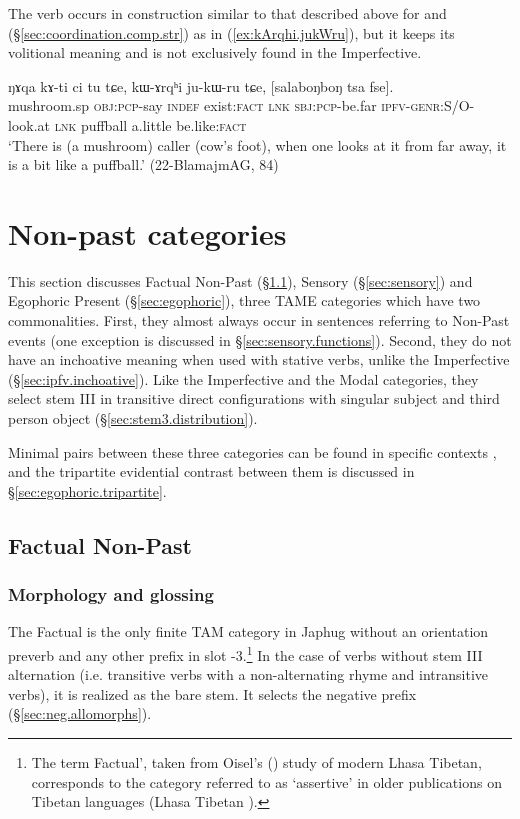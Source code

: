 The verb  occurs in construction similar to that described above for  and  (§\ref{sec:coordination.comp.str}) as in (\ref{ex:kArqhi.jukWru}), but it keeps its volitional meaning and is not exclusively found in the Imperfective.

\begin{exe}
\ex \label{ex:kArqhi.jukWru}
\gll ŋɤqa kɤ-ti ci tu tɕe, kɯ-ɤrqʰi ju-kɯ-ru tɕe, [salaboŋboŋ tsa fse].  \\
mushroom.sp \textsc{obj}:\textsc{pcp}-say \textsc{indef} exist:\textsc{fact} \textsc{lnk} \textsc{sbj}:\textsc{pcp}-be.far \textsc{ipfv}-\textsc{genr}:S/O-look.at \textsc{lnk} puffball a.little be.like:\textsc{fact} \\
\glt `There is (a mushroom) caller  (cow's foot), when one looks at it from far away, it is a bit like a puffball.' (22-BlamajmAG, 84)
\end{exe}

\section{Non-past categories} \label{sec:TAME.npst}
This section discusses Factual Non-Past (§\ref{sec:factual}), Sensory (§\ref{sec:sensory}) and Egophoric Present (§\ref{sec:egophoric}), three TAME categories which have two commonalities. First, they almost always occur in sentences referring to Non-Past events (one exception is discussed in §\ref{sec:sensory.functions}). Second, they do not have an inchoative meaning when used with stative verbs, unlike the Imperfective (§\ref{sec:ipfv.inchoative}). Like the Imperfective and the Modal categories, they select stem III in transitive direct configurations with singular subject and third person object (§\ref{sec:stem3.distribution}).

Minimal pairs between these three categories can be found in specific contexts \citep{jacques19egophoric}, and the tripartite evidential contrast between them is discussed in §\ref{sec:egophoric.tripartite}.

\subsection{Factual Non-Past} \label{sec:factual}
\subsubsection{Morphology and glossing} \label{sec:fact.morphology}
The Factual is the only finite TAM category in Japhug without an orientation preverb and any other prefix in slot -3.\footnote{The term Factual', taken from Oisel's (\citeyear{oisel13aux}) study of modern Lhasa Tibetan, corresponds to the category referred to as `assertive' in older publications on Tibetan languages (Lhasa Tibetan ).} In the case of verbs without stem III alternation (i.e. transitive verbs with a non-alternating rhyme and intransitive verbs), it is realized as the bare stem. It selects the negative prefix  (§\ref{sec:neg.allomorphs}). 

